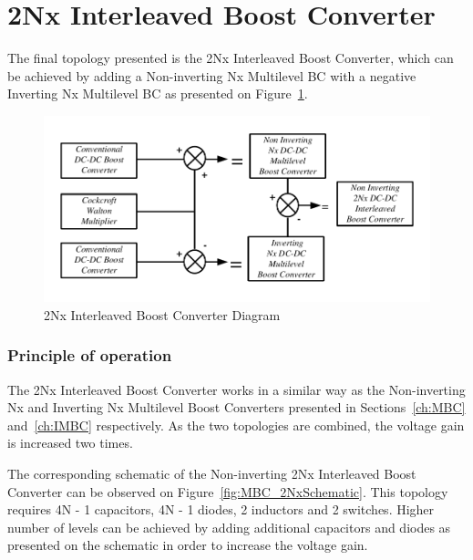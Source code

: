 \section{2Nx Interleaved Boost Converter}\label{ch:2Nx}

The final topology presented is the 2Nx Interleaved Boost Converter, which can be achieved by adding a Non-inverting Nx Multilevel BC with a negative Inverting Nx Multilevel BC as presented on Figure~\ref{fig:MBC_2NxDiagram}.\cite{Bhaskar2016}

\begin{figure}[H]
   \centering
   \includegraphics[width=\textwidth]{figures/yMultilevel/2Nx_Diagram.pdf}
    \caption{2Nx Interleaved Boost Converter Diagram}
	\label{fig:MBC_2NxDiagram}
\end{figure}

\subsubsection{Principle of operation}

The 2Nx Interleaved Boost Converter works in a similar way as the Non-inverting Nx and Inverting Nx Multilevel Boost Converters presented in Sections~\ref{ch:MBC} and~\ref{ch:IMBC} respectively. As the two topologies are combined, the voltage gain is increased two times.

The corresponding schematic of the Non-inverting 2Nx Interleaved Boost Converter can be observed on Figure~\ref{fig:MBC_2NxSchematic}. This topology requires 4N - 1 capacitors, 4N - 1 diodes, 2 inductors and 2 switches. Higher number of levels can be achieved by adding additional capacitors and diodes as presented on the schematic in order to increase the voltage gain.\cite{Bhaskar2016}

